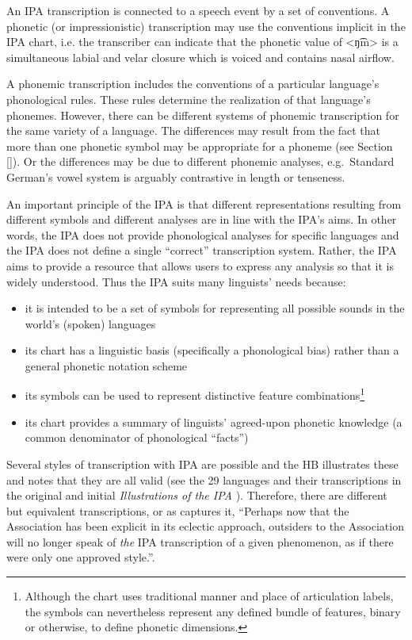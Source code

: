 An IPA transcription is connected to a speech event by a set of conventions. 
A phonetic (or impressionistic) transcription may use the conventions implicit 
in the IPA chart, i.e. the transcriber can indicate that the phonetic value of 
<ŋ͡m> is a simultaneous labial and velar closure which is voiced and contains 
nasal airflow. 

A phonemic transcription includes the conventions of a particular language's 
phonological rules. These rules determine the realization of that language's 
phonemes. However, there can be different systems of phonemic transcription 
for the same variety of a language. The differences may result from the fact 
that more than one phonetic symbol may be appropriate for a phoneme (see Section 
\ref{}). Or the differences may be due to different phonemic analyses, e.g.\ 
Standard German's vowel system is arguably contrastive in length or tenseness.

An important principle of the IPA is that different representations resulting 
from different symbols and different analyses are in line with the IPA's aims. 
In other words, the IPA does not provide phonological analyses for specific 
languages and the IPA does not define a single ``correct'' transcription system. 
Rather, the IPA aims to provide a resource that allows users to express any 
analysis so that it is widely understood. Thus the IPA suits many linguists' 
needs because:

\begin{itemize}
	\item it is intended to be a set of symbols for representing all possible sounds in the world's (spoken) languages
	\item its chart has a linguistic basis (specifically a phonological bias) rather than a general phonetic notation scheme
	\item its symbols can be used to represent distinctive feature combinations\footnote{Although the chart uses traditional manner and place of articulation labels, the symbols can nevertheless represent any defined bundle of features, binary or otherwise, to define phonetic dimensions.}
	\item its chart provides a summary of linguists' agreed-upon phonetic knowledge (a common denominator of phonological ``facts'')
\end{itemize}

Several styles of transcription with IPA are possible and the HB illustrates 
these and notes that they are all valid (see the 29 languages and their transcriptions 
in the original and initial \textit{Illustrations of the IPA} \citep[41--154]{IPA2007}). 
Therefore, there are different but equivalent transcriptions, or as \cite[64]{Ladefoged1990a} 
captures it, ``Perhaps now that the Association has been explicit in its eclectic 
approach, outsiders to the Association will no longer speak of \textit{the} IPA 
transcription of a given phenomenon, as if there were only one approved style.''.

